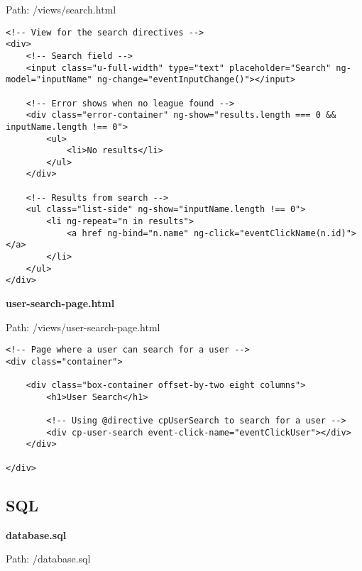 Path: /views/search.html

{\scriptsize
\begin{lstlisting}
<!-- View for the search directives -->
<div>
	<!-- Search field -->
	<input class="u-full-width" type="text" placeholder="Search" ng-model="inputName" ng-change="eventInputChange()"></input>

	<!-- Error shows when no league found -->
	<div class="error-container" ng-show="results.length === 0 && inputName.length !== 0">
		<ul>
			<li>No results</li>
		</ul>
	</div>

	<!-- Results from search -->
	<ul class="list-side" ng-show="inputName.length !== 0">
		<li ng-repeat="n in results">
			<a href ng-bind="n.name" ng-click="eventClickName(n.id)"></a>
		</li>
	</ul>
</div>\end{lstlisting}
}
\textbf{user-search-page.html}\label{user-search-page.html}

Path: /views/user-search-page.html

{\scriptsize
\begin{lstlisting}
<!-- Page where a user can search for a user -->
<div class="container">

	<div class="box-container offset-by-two eight columns">
		<h1>User Search</h1>

		<!-- Using @directive cpUserSearch to search for a user -->
		<div cp-user-search event-click-name="eventClickUser"></div>
	</div>

</div>\end{lstlisting}
}
\newpage
\subsection{SQL}
\textbf{database.sql}\label{database.sql}

Path: /database.sql

